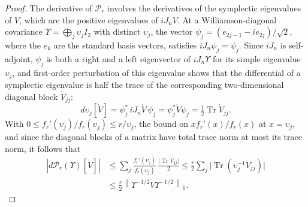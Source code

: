 \documentclass[11pt]{amsart}
\numberwithin{equation}{section}
\theoremstyle{definition}
\newcommand{\Tr}{\operatorname{Tr}}
\newcommand{\norm}[1]{\left\|#1\right\|}
\begin{document}
\begin{proof}
The derivative of \(\mathscr P_r\) involves the derivatives of the
symplectic eigenvalues of \(V\), which are the positive eigenvalues of
\(iJ_nV\). At a Williamson-diagonal covariance
\(\Upsilon=\bigoplus_j\upsilon_jI_2\) with distinct \(\upsilon_j\),
the vector \(\psi_j=(e_{2j-1}-ie_{2j})/\sqrt2\), where the \(e_k\) are
the standard basis vectors, satisfies \(iJ_n\psi_j=\psi_j\). Since
\(iJ_n\) is self-adjoint, \(\psi_j\) is both a right and a left
eigenvector of \(iJ_n\Upsilon\) for its simple eigenvalue
\(\upsilon_j\), and first-order perturbation of this eigenvalue shows
that the differential of a symplectic eigenvalue is half the trace of
the corresponding two-dimensional diagonal block \(\dot V_{jj}\):
\[
 d\upsilon_j[\dot V]
 =\psi_j^*\,iJ_n\dot V\,\psi_j
 =\psi_j^*\dot V\psi_j
 =\tfrac12\Tr\dot V_{jj}.
\]
With \(0\le f_r'(\upsilon_j)/f_r(\upsilon_j)\le r/\upsilon_j\), the bound on
\(xf_r'(x)/f_r(x)\) at \(x=\upsilon_j\), and
since the diagonal blocks of a matrix have total trace norm at most
its trace norm, it follows that
\begin{align*}
 |d\mathscr P_r(\Upsilon)[\dot V]|
 &\le\sum_j\frac{f_r'(\upsilon_j)}{f_r(\upsilon_j)}\,
   \frac{\lvert\Tr\dot V_{jj}\rvert}2
 \le\frac r2\sum_j\bigl|\Tr(\upsilon_j^{-1}\dot V_{jj})\bigr|\\
 &\le\frac r2\norm{\Upsilon^{-1/2}\dot V\Upsilon^{-1/2}}_1.
\end{align*}


\end{proof}
\end{document}
